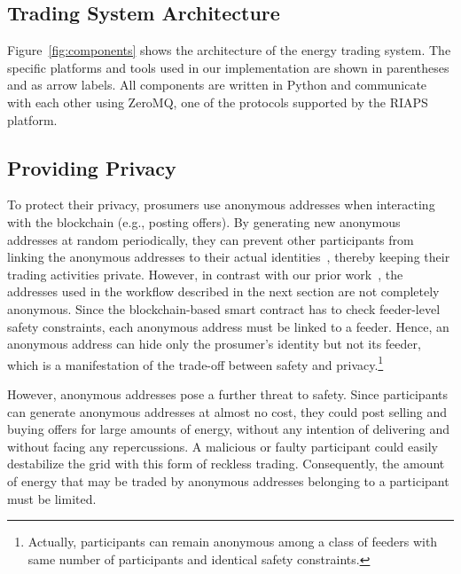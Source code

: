 \subsection{Trading System Architecture}
\label{sec:architecture}


Figure~\ref{fig:components} shows the architecture of the energy trading system. The specific platforms and tools used in our implementation are shown in parentheses and as arrow labels. All components are written in Python and communicate with each other using ZeroMQ, one of the protocols supported by the RIAPS platform. 




\subsection{Providing Privacy}
\label{sec:privacy}

To protect their privacy, prosumers use anonymous addresses when interacting with the blockchain (e.g., posting offers).
By generating new anonymous addresses at random periodically, they can prevent other participants from linking the anonymous addresses to their actual identities~\cite{Laszka17}, thereby keeping their trading activities private. 
However, in contrast with our prior work~\cite{Laszka17}, the addresses used in the workflow described in the next section are not completely anonymous. Since the blockchain-based smart contract has to check feeder-level safety constraints, each anonymous address must be linked to a feeder.
Hence, an anonymous address can hide only the prosumer's identity but not its feeder, which is a manifestation of the trade-off between safety and privacy.\footnote{Actually, participants can remain anonymous among a class of feeders with same number of participants and identical safety constraints.}

However, anonymous addresses pose a further threat to safety.
Since participants can generate anonymous addresses at almost no cost, they could post selling and buying offers for large amounts of energy, without any intention of delivering and without facing any repercussions.
A malicious or faulty participant could easily destabilize the grid with this form of reckless trading.
Consequently, the amount of energy that may be traded by anonymous addresses belonging to a participant must be limited.

